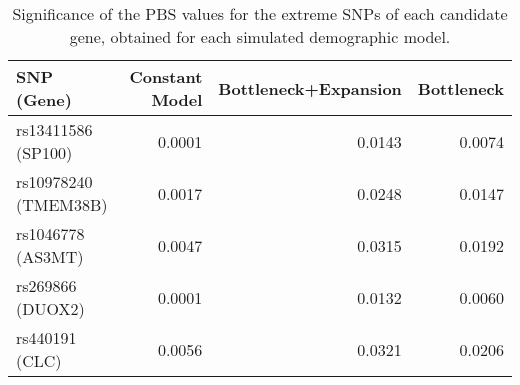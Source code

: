 \begin{table}[!htbp]
    \centering
    \begin{tabular}{lrrr}
    \toprule
    SNP (Gene) & Constant Model & Bottleneck+Expansion & Bottleneck \\
    \midrule
    rs13411586 (SP100) & 0.0001 & 0.0143 & 0.0074 \\
    rs10978240 (TMEM38B) & 0.0017 & 0.0248 & 0.0147 \\
    rs1046778 (AS3MT) & 0.0047 & 0.0315 & 0.0192 \\
    rs269866 (DUOX2) & 0.0001 & 0.0132 & 0.0060 \\
    rs440191 (CLC) & 0.0056 & 0.0321 & 0.0206 \\
    \bottomrule
    \end{tabular}
    
    \caption{Significance of the PBS values for the extreme SNPs of each candidate gene, obtained for each simulated demographic model.}
    \label{tab:SciRep_tableS1}
    
\end{table}